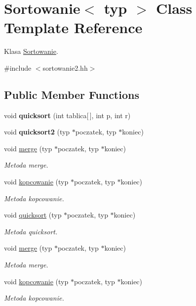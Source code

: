 \hypertarget{class_sortowanie}{\section{Sortowanie$<$ typ $>$ Class Template Reference}
\label{class_sortowanie}
}


Klasa \hyperlink{class_sortowanie}{Sortowanie}.  




{\ttfamily \#include $<$sortowanie2.\-hh$>$}

\subsection*{Public Member Functions}
\begin{DoxyCompactItemize}
\item 
\hypertarget{class_sortowanie_abcffc2598798cacab53eee1710068f11}{void {\bfseries quicksort} (int tablica\mbox{[}$\,$\mbox{]}, int p, int r)}\label{class_sortowanie_abcffc2598798cacab53eee1710068f11}

\item 
\hypertarget{class_sortowanie_aa2d15bda5e88241551c4b13fc20d95b7}{void {\bfseries quicksort2} (typ $\ast$poczatek, typ $\ast$koniec)}\label{class_sortowanie_aa2d15bda5e88241551c4b13fc20d95b7}

\item 
void \hyperlink{class_sortowanie_a9304c2c6588d1ef2829634d961c5614b}{merge} (typ $\ast$poczatek, typ $\ast$koniec)
\begin{DoxyCompactList}\small\item\em Metoda merge. \end{DoxyCompactList}\item 
void \hyperlink{class_sortowanie_a9bd230f2557cd85defb27e8179909b13}{kopcowanie} (typ $\ast$poczatek, typ $\ast$koniec)
\begin{DoxyCompactList}\small\item\em Metoda kopcowanie. \end{DoxyCompactList}\item 
void \hyperlink{class_sortowanie_a63f8994c000e984f1a5dc747a8c30d33}{quicksort} (typ $\ast$poczatek, typ $\ast$koniec)
\begin{DoxyCompactList}\small\item\em Metoda quicksort. \end{DoxyCompactList}\item 
void \hyperlink{class_sortowanie_a9304c2c6588d1ef2829634d961c5614b}{merge} (typ $\ast$poczatek, typ $\ast$koniec)
\begin{DoxyCompactList}\small\item\em Metoda merge. \end{DoxyCompactList}\item 
void \hyperlink{class_sortowanie_a9bd230f2557cd85defb27e8179909b13}{kopcowanie} (typ $\ast$poczatek, typ $\ast$koniec)
\begin{DoxyCompactList}\small\item\em Metoda kopcowanie. \end{DoxyCompactList}\end{DoxyCompactItemize}



